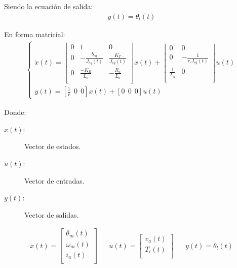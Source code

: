 \documentclass{article}
\begin{document}
\begin{sloppypar}
Siendo la ecuación de salida:
\begin{align} \label{eq:ecuación de salida}
    y(t) = \theta_l(t)
\end{align}

En forma matricial:
\begin{align} \label{eq:modelo completo de la planta en forma matricial}
    \begin{cases}
        \dot{x}\left(t\right)=\left[\begin{matrix}0&1&0\\0&-\frac{b_{eq}}{J_{eq}(t)}&\frac{K_T}{J_{eq}(t)}\\0&\frac{-K_E}{L_a}&-\frac{R_a}{L_a}\\\end{matrix}\right]x\left(t\right)+\left[\begin{matrix}0&0\\0&-\frac{1}{{r.J}_{eq}(t)}\\\frac{1}{L_a}&0\\\end{matrix}\right]u\left(t\right)
        \\
        y\left(t\right)=\left[\frac{1}{r}\ \ 0\ \ 0\right]x\left(t\right)+\left[0\ \ 0\ \ 0\right]u\left(t\right)
    \end{cases}
\end{align}

Donde:
\begin{description}
	\item[$x(t):$] Vector de estados.
	\item[$u(t):$] Vector de entradas.
	\item[$y(t):$] Vector de salidas.
\end{description}

\begin{align}  \label{eq:vectores de estados, entradas y salidas de la planta completa}
    x(t)=\left[\begin{matrix}\theta_m\left(t\right)\\\omega_m\left(t\right)\\i_a\left(t\right)\\\end{matrix}\right]
    &&
    u(t)=\left[\begin{matrix}v_a\left(t\right)\\T_l\left(t\right)\\\end{matrix}\right]
    &&
    y(t)=\theta_l\left(t\right)
\end{align}


\end{sloppypar}
\end{document}
